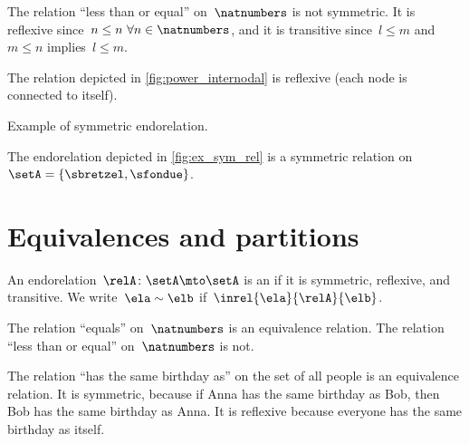 \begin{example}
	The relation ``less than or equal'' on~$\natnumbers$ is not symmetric.
	It is reflexive since~$n\leq n \ \forall n\in \natnumbers$, and it is transitive since~$l\leq m$ and~$m\leq n$ implies~$l\leq m$.
\end{example}

\begin{example}
	The relation depicted in \vref{fig:power_internodal} is reflexive (each node is connected to itself).
\end{example}
\begin{marginfigure}
	\centering
	\caption{Example of symmetric endorelation.}
	\label{fig:ex_sym_rel}
\end{marginfigure}
\begin{example}
	The endorelation depicted in \vref{fig:ex_sym_rel} is a symmetric relation on~$\setA=\{\sbretzel,\sfondue\}$.
\end{example}


\section{Equivalences and partitions}
\begin{ctdefinition}
	\label{def:equivalence-relation}
	An endorelation~$\relA\colon \setA\mto \setA$ is an \emph{} if it is symmetric, reflexive, and transitive.
	We write~$\ela\sim \elb$ if~$\inrel{\ela}{\relA}{\elb}$.
\end{ctdefinition}

\begin{example}
	The relation ``equals'' on~$\natnumbers$ is an equivalence relation.
	The relation ``less than or equal'' on~$\natnumbers$ is not.
\end{example}

\begin{example}
	The relation ``has the same birthday as'' on the set of all people is an equivalence relation.
	It is symmetric, because if Anna has the same birthday as Bob, then Bob has the same birthday as Anna.
	It is reflexive because everyone has the same birthday as itself.
\end{example}


